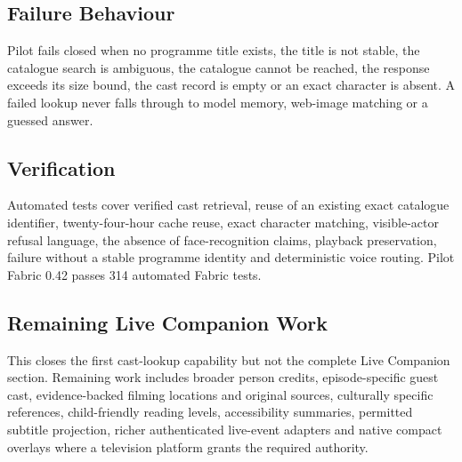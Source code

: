 \subsection{Failure Behaviour}

Pilot fails closed when no programme title exists, the title is not stable, the
catalogue search is ambiguous, the catalogue cannot be reached, the response exceeds
its size bound, the cast record is empty or an exact character is absent. A failed
lookup never falls through to model memory, web-image matching or a guessed answer.

\subsection{Verification}

Automated tests cover verified cast retrieval, reuse of an existing exact catalogue
identifier, twenty-four-hour cache reuse, exact character matching, visible-actor
refusal language, the absence of face-recognition claims, playback preservation,
failure without a stable programme identity and deterministic voice routing. Pilot
Fabric 0.42 passes 314 automated Fabric tests.

\subsection{Remaining Live Companion Work}

This closes the first cast-lookup capability but not the complete Live Companion
section. Remaining work includes broader person credits, episode-specific guest
cast, evidence-backed filming locations and original sources, culturally specific
references, child-friendly reading levels, accessibility summaries, permitted
subtitle projection, richer authenticated live-event adapters and native compact
overlays where a television platform grants the required authority.
